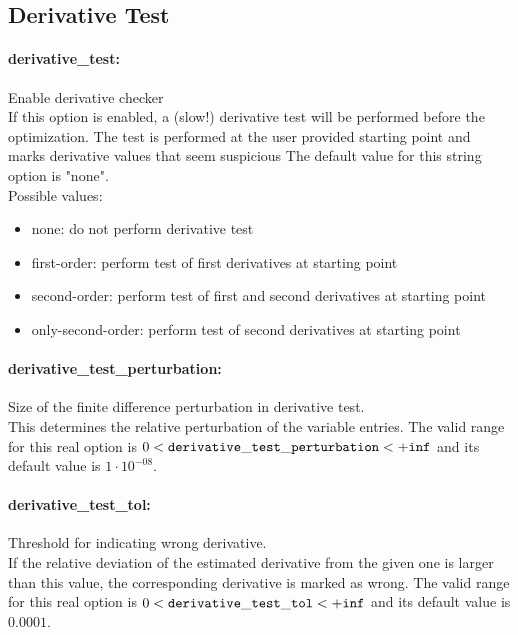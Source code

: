 \subsection{Derivative Test}

\paragraph{derivative\_test:}\label{sec:derivative_test} Enable derivative checker $\;$ \\
 If this option is enabled, a (slow!) derivative
test will be performed before the optimization. 
The test is performed at the user provided
starting point and marks derivative values that
seem suspicious
The default value for this string option is "none".
\\ 
Possible values:
\begin{itemize}
   \item none: do not perform derivative test
   \item first-order: perform test of first derivatives at starting
point
   \item second-order: perform test of first and second derivatives at
starting point
   \item only-second-order: perform test of second derivatives at starting
point
\end{itemize}

\paragraph{derivative\_test\_perturbation:}\label{sec:derivative_test_perturbation} Size of the finite difference perturbation in derivative test. $\;$ \\
 This determines the relative perturbation of the
variable entries. The valid range for this real option is 
$0 <  {\tt derivative\_test\_perturbation } <  {\tt +inf}$
and its default value is $1 \cdot 10^{-08}$.


\paragraph{derivative\_test\_tol:}\label{sec:derivative_test_tol} Threshold for indicating wrong derivative. $\;$ \\
 If the relative deviation of the estimated
derivative from the given one is larger than this
value, the corresponding derivative is marked as
wrong. The valid range for this real option is 
$0 <  {\tt derivative\_test\_tol } <  {\tt +inf}$
and its default value is $0.0001$.


